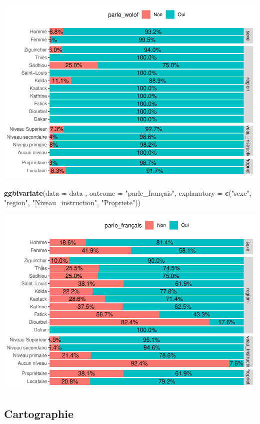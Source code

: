 \documentclass[
]{article}
\newenvironment{Shaded}{\begin{snugshade}}{\end{snugshade}}
\newcommand{\AttributeTok}[1]{\textcolor[rgb]{0.13,0.29,0.53}{#1}}
\newcommand{\FunctionTok}[1]{\textcolor[rgb]{0.13,0.29,0.53}{\textbf{#1}}}
\newcommand{\NormalTok}[1]{#1}
\newcommand{\StringTok}[1]{\textcolor[rgb]{0.31,0.60,0.02}{#1}}
\begin{document}
\includegraphics{RMarkdown_files/figure-latex/unnamed-chunk-16-1.pdf}

\begin{Shaded}
\begin{Highlighting}[]
\FunctionTok{ggbivariate}\NormalTok{(}\AttributeTok{data =}\NormalTok{ data , }\AttributeTok{outcome =} \StringTok{"parle\_français"}\NormalTok{, }\AttributeTok{explanatory =} \FunctionTok{c}\NormalTok{(}\StringTok{"sexe"}\NormalTok{, }\StringTok{"region"}\NormalTok{, }\StringTok{"Niveau\_instruction"}\NormalTok{, }\StringTok{"Propriete"}\NormalTok{))}
\end{Highlighting}
\end{Shaded}

\includegraphics{RMarkdown_files/figure-latex/unnamed-chunk-16-2.pdf}

\hypertarget{cartographie}{%
\subsection{Cartographie}\label{cartographie}}
\end{document}
